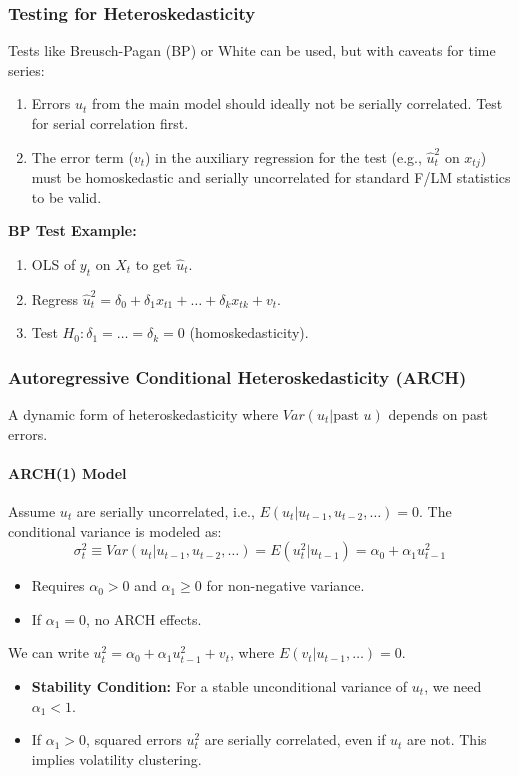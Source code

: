 \documentclass[a4paper, 10pt]{article}
\theoremstyle{definition}	%
\begin{document}
\subsubsection{Testing for Heteroskedasticity}
Tests like Breusch-Pagan (BP) or White can be used, but with caveats for time series:
\begin{enumerate}
    \item Errors \(u_t\) from the main model should ideally not be serially correlated. Test for serial correlation first.
    \item The error term (\(v_t\)) in the auxiliary regression for the test (e.g., \(\hat{u}_t^2\) on \(x_{tj}\)) must be homoskedastic and serially uncorrelated for standard F/LM statistics to be valid.
\end{enumerate}
\textbf{BP Test Example:}
\begin{enumerate}
    \item OLS of \(y_t\) on \(X_t\) to get \(\hat{u}_t\).
    \item Regress \(\hat{u}_t^2 = \delta_0 + \delta_1 x_{t1} + \dots + \delta_k x_{tk} + v_t\).
    \item Test \(H_0: \delta_1 = \dots = \delta_k = 0\) (homoskedasticity).
\end{enumerate}

\subsubsection{Autoregressive Conditional Heteroskedasticity (ARCH)}
A dynamic form of heteroskedasticity where \(Var(u_t | \text{past } u)\) depends on past errors.
\paragraph{ARCH(1) Model}
Assume \(u_t\) are serially uncorrelated, i.e., \(E(u_t | u_{t-1}, u_{t-2}, \dots) = 0\).
The conditional variance is modeled as:
\begin{equation} \label{eq:arch1_cond_var}
\sigma_t^2 \equiv Var(u_t | u_{t-1}, u_{t-2}, \dots) = E(u_t^2 | u_{t-1}) = \alpha_0 + \alpha_1 u_{t-1}^2
\end{equation}
\begin{itemize}
    \item Requires \(\alpha_0 > 0\) and \(\alpha_1 \ge 0\) for non-negative variance.
    \item If \(\alpha_1 = 0\), no ARCH effects.
\end{itemize}
We can write \(u_t^2 = \alpha_0 + \alpha_1 u_{t-1}^2 + v_t\), where \(E(v_t | u_{t-1}, \dots) = 0\).
\begin{itemize}
    \item \textbf{Stability Condition:} For a stable unconditional variance of \(u_t\), we need \(\alpha_1 < 1\).
    \item If \(\alpha_1 > 0\), squared errors \(u_t^2\) are serially correlated, even if \(u_t\) are not. This implies volatility clustering.
\end{itemize}
\end{document}
